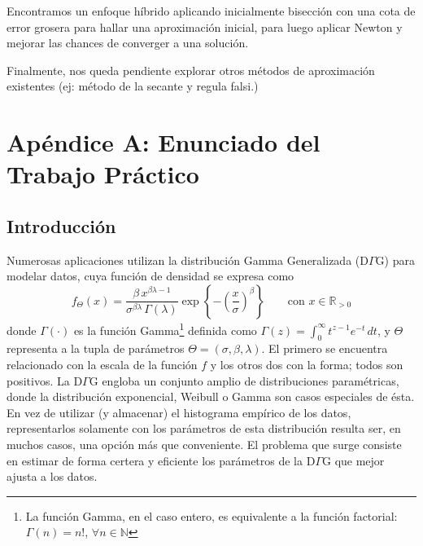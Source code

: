 \documentclass[a4paper,10pt,twoside]{article}
\begin{document}
Encontramos un enfoque híbrido aplicando inicialmente bisección con una cota de
error grosera para hallar una aproximación inicial, para luego aplicar Newton y
mejorar las chances de converger a una solución.

Finalmente, nos queda pendiente explorar otros  métodos de aproximación existentes
(ej: método de la secante y regula falsi.)




\section{Apéndice A: Enunciado del Trabajo Práctico}

\newcommand{\real}{\mathbb{R}}
\newcommand{\nat}{\mathbb{N}}
\newcommand{\eme}{\mathcal{M}}
\newcommand{\emeh}{\widehat{\mathcal{M}}}
\newcommand{\ere}{\mathcal{R}}

\subsection{Introducci\'on}

Numerosas aplicaciones utilizan la distribuci\'on Gamma Generalizada (D$\Gamma$G) para modelar datos, cuya funci\'on de densidad se expresa como $$f_\Theta(x)=\frac{\beta\, x^{\beta \lambda - 1}}{\sigma^{\beta \lambda}\, \Gamma(\lambda)} \exp\left\{-\left(\frac{x}{\sigma} \right)^\beta \right\}\qquad\textrm{con } x\in\real_{>0}$$ donde 
$\Gamma(\cdot)$ es la funci\'on Gamma\footnote{La funci\'on Gamma, en el caso entero, es equivalente a la funci\'on factorial: $\Gamma(n)=n!$, $\forall n\in\nat$ } definida como $\Gamma(z)=\int_0^{\infty}{t^{z-1}e^{-t}\,dt}$, y $\Theta$ representa a la tupla de par\'ametros $\Theta=(\sigma,\beta,\lambda)$. El primero se encuentra relacionado con la escala de la funci\'on $f$ y los otros dos con la forma; todos son positivos.
La D$\Gamma$G engloba un conjunto amplio de distribuciones param\'etricas, donde la distribuci\'on exponencial, Weibull o Gamma son casos especiales de \'esta.
En vez de utilizar (y almacenar) el histograma emp\'irico de los datos, representarlos solamente con los par\'ametros de esta distribuci\'on resulta ser, en muchos casos, una opci\'on m\'as que conveniente. El problema que surge consiste en estimar de forma certera y eficiente los par\'ametros de la D$\Gamma$G que mejor ajusta a los datos.
\end{document}

